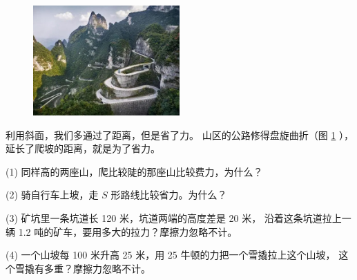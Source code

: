 \begin{figure}[htbp]
    \centering
    \includegraphics[width=0.5\textwidth]{../pic/czwl1-ch8-8}
    \caption{}\label{fig:8-8}
\end{figure}

利用斜面，我们多通过了距离，但是省了力。
山区的公路修得盘旋曲折（图 \ref{fig:8-8} \footnotemark），延长了爬坡的距离，就是为了省力。



\lianxi

(1) 同样高的两座山，爬比较陡的那座山比较费力，为什么？

(2) 骑自行车上坡，走 $S$ 形路线比较省力。为什么？

(3) 矿坑里一条坑道长 120 米，坑道两端的高度差是 20 米，
沿着这条坑道拉上一辆 1.2 吨的矿车，要用多大的拉力？摩擦力忽略不计。

(4) 一个山坡每 100 米升高 25 米，用 25 牛顿的力把一个雪撬拉上这个山坡，
这个雪撬有多重？摩擦力忽略不计。


